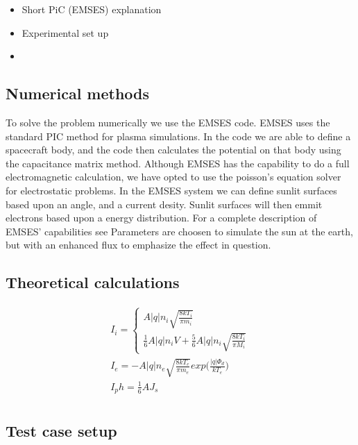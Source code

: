 \begin{itemize}
	\item Short PiC (EMSES) explanation
	\item Experimental set up
	\item 
\end{itemize}
\subsection{Numerical methods}

To solve the problem numerically we use the EMSES code. EMSES uses the standard PIC method for plasma simulations.
In the code we are able to define a spacecraft body, and the code then calculates the potential on that body using the capacitance matrix method.
Although EMSES has the capability to do a full electromagnetic calculation, we have opted to use the poisson's equation 
solver for electrostatic problems. In the EMSES system we can define sunlit surfaces based upon an angle, and a current 
desity. Sunlit surfaces will then emmit electrons based upon a energy distribution. For a complete description of EMSES' capabilities
see \citep{nakashima_ohhelp:_2009} Parameters are choosen to simulate the sun at the earth, but with an enhanced flux to emphasize the effect in question. 

\subsection{Theoretical calculations}

\begin{equation}
\begin{split}
 I_i =
    \left\{\begin{array}{ccc}
       A|q|n_i\sqrt{\frac{8 k T_i}{\pi m_i}} \\
       \frac{1}{6}A |q|n_i V + \frac{5}{6} A |q| n_i \sqrt{\frac{8 k T_i}{\pi M_i}}
      \end{array}\right. \\
  I_e = -A|q|n_e \sqrt{\frac{8 k T_e}{\pi m_e}}exp\Big(\frac{|q|\Phi_d}{k T_e}\Big) \\
  I_ph = \frac{1}{6}AJ_s\\
\end{split}	
\label{thin sheet potential} 
\end{equation}




\subsection{Test case setup}

